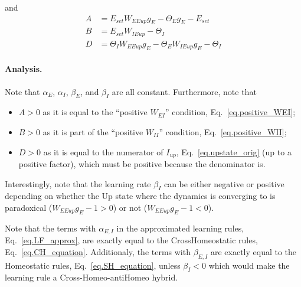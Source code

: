 \documentclass[twocolumn]{article}
\newcommand{\EE}{\mathit{EE}}
\newcommand{\EI}{\mathit{EI}}
\newcommand{\IE}{\mathit{IE}}
\newcommand{\II}{\mathit{II}}
\newcommand{\set}{\mathit{set}}
\newcommand{\up}{\mathit{up}}
\begin{document}
\noindent and
\begin{displaymath}
\begin{aligned}
A & = E_{\set} W_{\EE\up} g_E - \Theta_E g_E - E_{\set} \\
B & = E_{\set} W_{\IE\up} - \Theta_I \\
D & = \Theta_I W_{\EE\up} g_E - \Theta_E W_{\IE\up} g_E - \Theta_I
\end{aligned}
\end{displaymath}

\paragraph{Analysis.} Note that $\alpha_E$, $\alpha_I$, $\beta_E$, and $\beta_I$ are all constant. Furthermore, note that
\begin{itemize}
\item $A>0$ as it is equal to the ``positive $W_{\EI}$'' condition, Eq.\ \ref{eq.positive_WEI};
\item $B>0$ as it is part of the ``positive $W_{\II}$'' condition, Eq.\ \ref{eq.positive_WII};
\item $D>0$ as it is equal to the numerator of $I_{\up}$, Eq.\ \ref{eq.upstate_orig} (up to a positive factor), which must be positive because the denominator is.
\end{itemize}

\noindent Interestingly, note that the learning rate $\beta_I$ can be either negative or positive depending on whether the Up state where the dynamics is converging to is paradoxical ($W_{\EE\up}g_E - 1 > 0$) or not ($W_{\EE\up}g_E - 1 < 0$).


\noindent Note that the terms with $\alpha_{E,I}$ in the approximated learning rules, Eq.\ \ref{eq.LF_approx}, are exactly equal to the CrossHomeostatic rules, Eq.\ \ref{eq.CH_equation}. Additionaly, the terms with $\beta_{E,I}$ are exactly equal to the Homeostatic rules, Eq.\ \ref{eq.SH_equation}, unless $\beta_I<0$ which would make the learning rule a Cross-Homeo-antiHomeo hybrid.





\printbibliography
\end{document}
